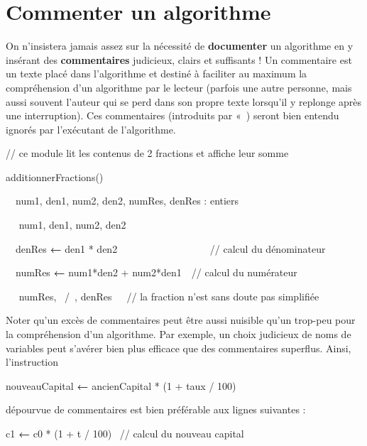\bigskip

\section[Commenter un algorithme]{\bfseries Commenter un
algorithme}
{
On n’insistera jamais assez sur la nécessité de \textbf{documenter} un
algorithme en y insérant des \textbf{commentaires} judicieux, clairs et
suffisants ! Un commentaire est un texte placé dans
l'algorithme et destiné à faciliter au maximum la
compréhension d’un algorithme par le lecteur (parfois une autre
personne, mais aussi souvent l'auteur qui se perd dans
son propre texte lorsqu'il y replonge après une
interruption). Ces commentaires (introduits par
«~) seront bien entendu ignorés par
l’exécutant de l’algorithme.}

{\sffamily
// ce module lit les contenus de 2 fractions et affiche leur somme}

{\sffamily
{} additionnerFractions()}


\bigskip

{\sffamily
\ \ num1, den1, num2, den2, numRes, denRes : entiers}


\bigskip

{\sffamily
\ \  num1, den1, num2, den2}

{\sffamily
{\ \ denRes
}{\textbf{←}}{ den1 *
den2 \ \ \ \ \ \ \ \ \ \ \ \ \ \ \ \ \ \ // calcul du dénominateur}}

{\sffamily
{\ \ numRes
}{\textbf{←}}{
num1*den2 + num2*den1\ \ // calcul du numérateur}}

{\sffamily
\ \  numRes, {\textquotedbl}~/~{\textquotedbl},
denRes\ \  \ // la fraction n'est sans doute pas
simplifiée}


\bigskip

{\sffamily
{} }

{
Noter qu’un excès de commentaires peut être aussi nuisible qu’un
trop-peu pour la compréhension d’un algorithme. Par exemple, un choix
judicieux de noms de variables peut s’avérer bien plus efficace que des
commentaires superflus. Ainsi, l’instruction}

{\sffamily
nouveauCapital {\textbf{←}} ancienCapital * (1 +
taux / 100)}

{
dépourvue de commentaires est bien préférable aux lignes suivantes :}

{\sffamily
c1 {\textbf{←}} c0 * (1 + t / 100) \ // calcul
du nouveau capital}

